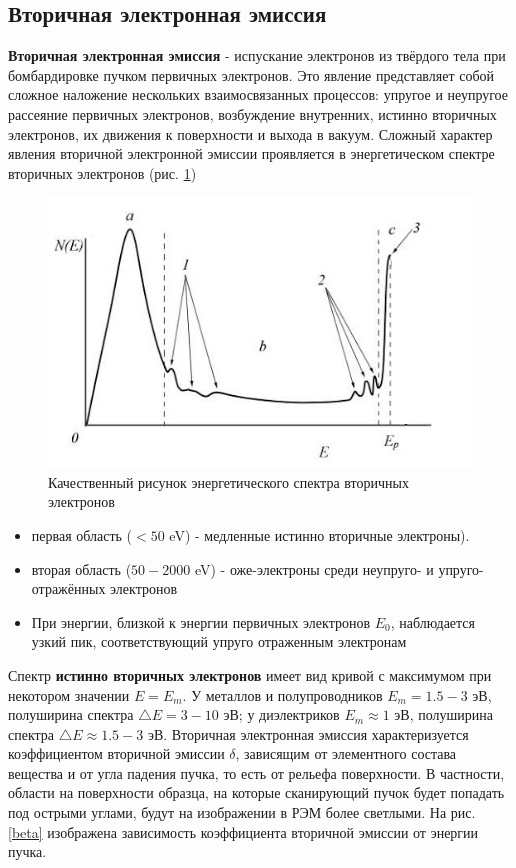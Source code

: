 \documentclass[a4paper]{article}
\begin{document}
\subsection{Вторичная электронная эмиссия}

\textbf{Вторичная электронная эмиссия} - испускание электронов из твёрдого тела при бомбардировке пучком первичных электронов. 
Это явление представляет собой сложное наложение нескольких взаимосвязанных процессов: упругое и неупругое рассеяние первичных 
электронов, возбуждение внутренних, истинно вторичных электронов, их движения к поверхности и выхода в вакуум. Сложный характер 
явления вторичной электронной эмиссии проявляется в энергетическом спектре вторичных электронов (рис. \ref{spectr})

\begin{figure}[H]
    \centering
    \includegraphics[scale = 2]{1.jpg}
    \caption{Качественный рисунок энергетического спектра вторичных электронов}
    \label{spectr}
    \end{figure}

\begin{itemize}
    \item первая область ($<50$ eV) - медленные истинно вторичные электроны).
    \item вторая область ($50 - 2000$ eV) - оже-электроны среди неупруго- и упруго-отражённых электронов 
    \item При энергии, близкой к энергии первичных электронов $E_0$, наблюдается узкий пик, соответствующий упруго отраженным электронам
\end{itemize}

Спектр \textbf{истинно вторичных электронов} имеет вид кривой с максимумом при некотором значении $E = E_m$. У металлов и полупроводников $E_m = 1.5 - 3$ эВ, 
полуширина спектра $\triangle E = 3 - 10$ эВ; у диэлектриков $E_m \approx 1$ эВ, полуширина спектра $\triangle E \approx 1.5 - 3$ эВ. Вторичная электронная 
эмиссия характеризуется коэффициентом вторичной эмиссии $\delta$, зависящим от элементного состава вещества и от угла падения пучка, то есть от рельефа поверхности. 
В частности, области на поверхности образца, на которые сканирующий пучок будет попадать под острыми углами, будут на изображении в РЭМ более светлыми. На рис. \ref{beta} 
изображена зависимость коэффициента вторичной эмиссии от энергии пучка. \par 
\end{document}
